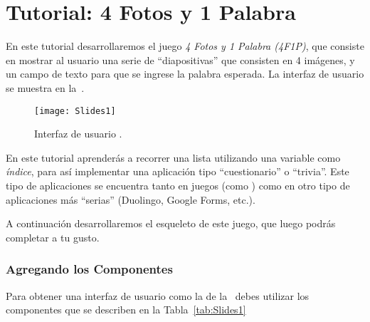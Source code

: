 \section{Tutorial: 4 Fotos y 1 Palabra}

En este tutorial desarrollaremos el juego \emph{4 Fotos y 1 Palabra
  (4F1P)}, que consiste en mostrar al usuario una serie de
``diapositivas'' que consisten en 4 imágenes, y un campo de texto para
que se ingrese la palabra esperada. La interfaz de usuario se muestra
en la~.

\begin{figure}[H]
  \centering
  \texttt{[image: Slides1]}
  \caption{Interfaz de usuario .}
  \label{fig:Slides1}
\end{figure}

En este tutorial aprenderás a recorrer una lista utilizando una
variable como \emph{índice}, para así implementar una aplicación tipo
``cuestionario'' o ``trivia''. Este tipo de aplicaciones se encuentra
tanto en juegos (como ) como en otro tipo de
aplicaciones más ``serias'' (Duolingo, Google Forms, etc.).

A continuación desarrollaremos el esqueleto de este juego, que luego
podrás completar a tu gusto.

\subsubsection*{Agregando los Componentes}

Para obtener una interfaz de usuario como la de la~
debes utilizar los componentes que se describen en la
Tabla~\ref{tab:Slides1}

